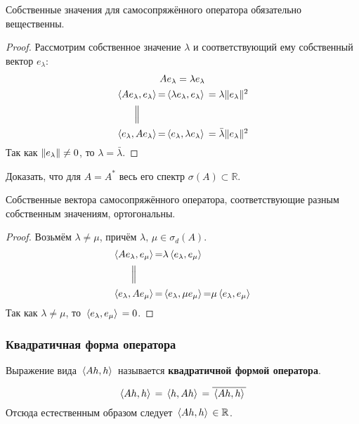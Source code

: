 \documentclass[12pt]{article}
\begin{document}
	\begin{state}
		Собственные значения для самосопряжённого оператора обязательно вещественны.
	\end{state}
	\begin{proof}
		Рассмотрим собственное значение $\lambda$ и соответствующий ему собственный вектор $e_{\lambda}$:
		\begin{gather*}
			Ae_{\lambda} = \lambda e_{\lambda} \\
			\begin{CD}
				\scal{Ae_{\lambda}}{e_{\lambda}} @.=@. \scal{\lambda e_{\lambda}}{e_{\lambda}} = \lambda \norm{e_{\lambda}}^2 \\
				@| \\
				\scal{e_{\lambda}}{Ae_{\lambda}} @.=@. \scal{e_{\lambda}}{\lambda e_{\lambda}} = \bar{\lambda} \norm{e_{\lambda}}^2 
			\end{CD}
		\end{gather*}
		Так как $\| e_{\lambda} \| \neq 0$, то $\lambda = \bar{\lambda}$.
	\end{proof}
	\exc Доказать, что для $A = A^{*}$ весь его спектр $\sigma(A) \subset \mathbb{R}$.
	
	\begin{note}
		Собственные вектора самосопряжённого оператора, соответствующие разным собственным значениям, ортогональны.
	\end{note}
	\begin{proof} %
		Возьмём $\lambda \neq \mu$, причём $\lambda,\, \mu \in \sigma_d(A)$.
		$$
			\begin{CD}
				\scal{Ae_{\lambda}}{e_{\mu}} @.=@. \lambda\scal{e_{\lambda}}{e_{\mu}} \\
				@| \\
				\scal{e_{\lambda}}{Ae_{\mu}} @.=@. \scal{e_{\lambda}}{\mu e_{\mu}} @.=@. \mu\scal{e_{\lambda}}{e_{\mu}}
			\end{CD}
		$$
		Так как $\lambda \neq \mu$, то $\, \langle e_{\lambda}, e_{\mu} \rangle \, = 0$.
	\end{proof}
	
	\subsubsection{Квадратичная форма оператора}
	\begin{defi}
		Выражение вида $\, \langle Ah, h \rangle \,$ называется \textbf{квадратичной формой оператора}.
	\end{defi}
	
	\begin{state}
		$$\, \langle Ah, h \rangle \, = \, \langle h, Ah \rangle \, = \overline{\, \langle Ah, h \rangle \,}$$
		Отсюда естественным образом следует $\, \langle Ah, h \rangle \, \in \mathbb{R}$.
	\end{state}
	
\end{document}
